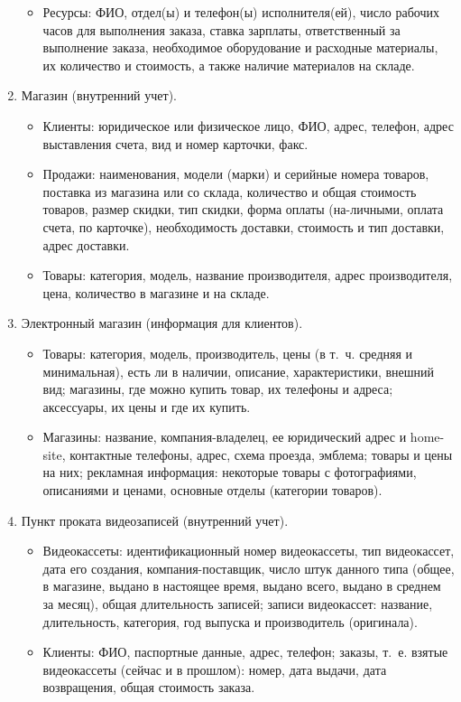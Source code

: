 \documentclass[12pt, openany, twoside]{book} %
\begin{document}
\begin{enumerate}
\begin{itemize}
\item Ресурсы: ФИО, отдел(ы) и телефон(ы) исполнителя(ей), число рабочих часов для выполнения заказа, ставка зарплаты, ответственный за выполнение заказа, необходимое оборудование и расходные материалы, их количество и стоимость, а также наличие материалов на складе.
\end{itemize}
\item Магазин (внутренний учет).
\begin{itemize}
\item Клиенты: юридическое или физическое лицо, ФИО, адрес, телефон, адрес выставления счета, вид и номер карточки, факс.
\item Продажи: наименования, модели (марки) и серийные номера товаров, поставка из магазина или со склада, количество и общая стоимость товаров, размер скидки, тип скидки, форма оплаты (на-личными, оплата счета, по карточке), необходимость доставки, стоимость и тип доставки, адрес доставки.
\item Товары: категория, модель, название производителя, адрес производителя, цена, количество в магазине и на складе.
\end{itemize}
\item Электронный магазин (информация для клиентов).
\begin{itemize}
\item Товары: категория, модель, производитель, цены (в т.~ч. средняя и минимальная), есть ли в наличии, описание, характеристики, внешний вид; магазины, где можно купить товар, их телефоны и адреса; аксессуары, их цены и где их купить.
\item Магазины: название, компания-владелец, ее юридический адрес и home-site, контактные телефоны, адрес, схема проезда, эмблема; товары и цены на них; рекламная информация: некоторые товары с фотографиями, описаниями и ценами, основные отделы (категории товаров).
\end{itemize}
\item Пункт проката видеозаписей (внутренний учет).
\begin{itemize}
\item Видеокассеты: идентификационный номер видеокассеты, тип видеокассет, дата его создания, компания-поставщик, число штук данного типа (общее, в магазине, выдано в настоящее время, выдано всего, выдано в среднем за месяц), общая длительность записей; записи видеокассет: название, длительность, категория, год выпуска и производитель (оригинала).
\item Клиенты: ФИО, паспортные данные, адрес, телефон; заказы, т.~е. взятые видеокассеты (сейчас и в прошлом): номер, дата выдачи, дата возвращения, общая стоимость заказа.

\end{itemize}
\end{enumerate}
\end{document}

